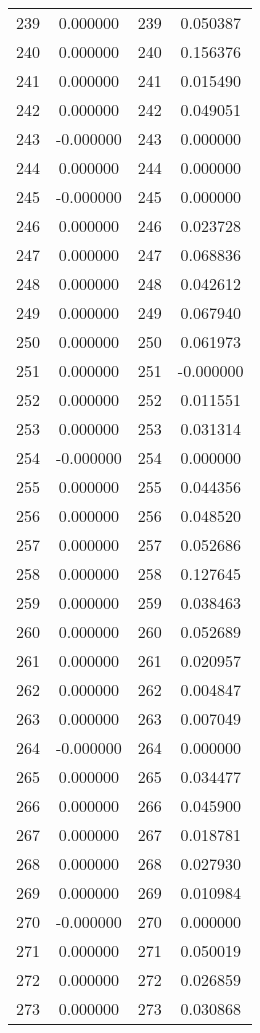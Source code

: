 \documentclass[12pt]{article}
\begin{document}
\begin{longtable}{@{}cccc@{}}
239 & 0.000000 & 239 & 0.050387 \\
240 & 0.000000 & 240 & 0.156376 \\
241 & 0.000000 & 241 & 0.015490 \\
242 & 0.000000 & 242 & 0.049051 \\
243 & -0.000000 & 243 & 0.000000 \\
244 & 0.000000 & 244 & 0.000000 \\
245 & -0.000000 & 245 & 0.000000 \\
246 & 0.000000 & 246 & 0.023728 \\
247 & 0.000000 & 247 & 0.068836 \\
248 & 0.000000 & 248 & 0.042612 \\
249 & 0.000000 & 249 & 0.067940 \\
250 & 0.000000 & 250 & 0.061973 \\
251 & 0.000000 & 251 & -0.000000 \\
252 & 0.000000 & 252 & 0.011551 \\
253 & 0.000000 & 253 & 0.031314 \\
254 & -0.000000 & 254 & 0.000000 \\
255 & 0.000000 & 255 & 0.044356 \\
256 & 0.000000 & 256 & 0.048520 \\
257 & 0.000000 & 257 & 0.052686 \\
258 & 0.000000 & 258 & 0.127645 \\
259 & 0.000000 & 259 & 0.038463 \\
260 & 0.000000 & 260 & 0.052689 \\
261 & 0.000000 & 261 & 0.020957 \\
262 & 0.000000 & 262 & 0.004847 \\
263 & 0.000000 & 263 & 0.007049 \\
264 & -0.000000 & 264 & 0.000000 \\
265 & 0.000000 & 265 & 0.034477 \\
266 & 0.000000 & 266 & 0.045900 \\
267 & 0.000000 & 267 & 0.018781 \\
268 & 0.000000 & 268 & 0.027930 \\
269 & 0.000000 & 269 & 0.010984 \\
270 & -0.000000 & 270 & 0.000000 \\
271 & 0.000000 & 271 & 0.050019 \\
272 & 0.000000 & 272 & 0.026859 \\
273 & 0.000000 & 273 & 0.030868 \\

\end{longtable}
\end{document}
